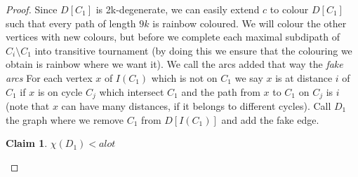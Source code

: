\documentclass[10pt]{article}
\theoremstyle{plain}
\newtheorem{claim}[theorem]{Claim}
\theoremstyle{definition}
\theoremstyle{remark}
\begin{document}
\begin{proof}
Since $D[C_1]$ is 2k-degenerate, we can easily extend $c$ to colour $D[C_1]$ such that every path of length $9k$ is rainbow coloured. 
We will colour the other vertices with  new colours, but before we complete each maximal subdipath of $C_i \setminus C_1$ into transitive tournament
(by doing this we ensure that the colouring we obtain is rainbow where we want it). We call the arcs added that way the \textit{fake arcs}  
For each vertex $x$ of $I(C_1)$ which is not on $C_1$ we say $x$ is at distance $i$
of $C_1$ if $x$ is on cycle $C_j$ which intersect $C_1$ and the path from $x$ to $C_1$ on $C_j$ is $i$
(note that $x$ can have many distances, if it belongs to different cycles). Call $D_1$ the graph where we remove $C_1$ from $D[I(C_1)]$ and add the fake
edge.

\begin{claim}
$\chi(D_1) < a lot$ 
\end{claim}


\end{proof}
\end{document}
